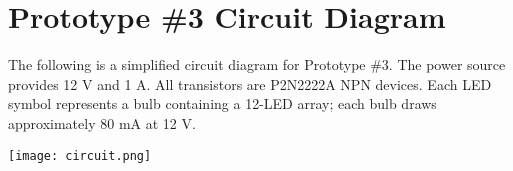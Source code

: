 \chapter{Prototype \#3 Circuit Diagram}

The following is a simplified circuit diagram for Prototype \#3. The power source provides 12 V and 1 A. All transistors are P2N2222A NPN devices. Each LED symbol represents a bulb containing a 12-LED array; each bulb draws approximately 80 mA at 12 V.

\vspace{1cm}

\begin{center}
\texttt{[image: circuit.png]}
\end{center}
